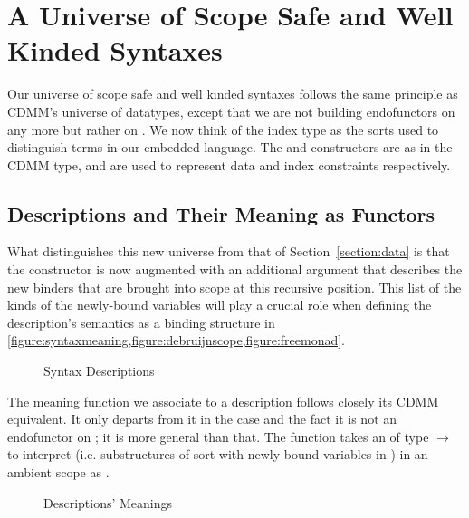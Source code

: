\chapter{A Universe of Scope Safe and Well Kinded Syntaxes}\label{chapter:universe}


Our universe of scope safe and well kinded syntaxes follows the same principle
as CDMM's universe of datatypes, except that we are not building endofunctors on
 any more but rather on { }. We now think of the index
type  as the sorts used to distinguish terms in our embedded language.
The  and  constructors are as in the CDMM  type,
and are used to represent data and index constraints respectively.

\section{Descriptions and Their Meaning as Functors}

What distinguishes this new universe  from that of
Section~\ref{section:data} is that the  constructor is now
augmented with an additional { } argument that describes
the new binders that are brought into scope at this recursive
position. This list of the kinds of the newly-bound variables will
play a crucial role when defining the description's semantics as a
binding structure in
\cref{figure:syntaxmeaning,figure:debruijnscope,figure:freemonad}.

\begin{figure}[h]
\caption{Syntax Descriptions\label{fig:Desc}}
\end{figure}

The meaning function  we associate to a description follows closely
its CDMM equivalent. It only departs from it in the  case and the fact
it is not an endofunctor on  ; it is more general than that.
The function takes an  of type
{  $\rightarrow$  }
to interpret {  } (i.e. substructures of sort  with
newly-bound variables in ) in an ambient scope  as
{   }.

\begin{figure}[h]
\caption{Descriptions' Meanings}\label{figure:syntaxmeaning}
\end{figure}

